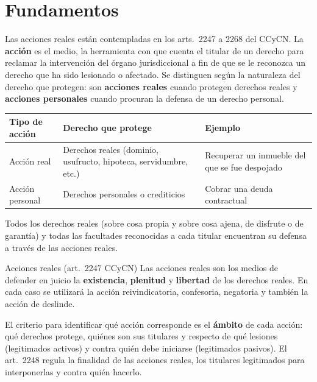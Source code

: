 \documentclass[12pt,oneside]{book}
\begin{document}
\section{Fundamentos}

Las acciones reales están contempladas en los arts.~2247 a 2268 del CCyCN. La \textbf{acción} es el medio, la herramienta con que cuenta el titular de un derecho para reclamar la intervención del órgano jurisdiccional a fin de que se le reconozca un derecho que ha sido lesionado o afectado. Se distinguen según la naturaleza del derecho que protegen: son \textbf{acciones reales} cuando protegen derechos reales y \textbf{acciones personales} cuando procuran la defensa de un derecho personal.

\begin{table}[H]
\centering
\begin{tabularx}{\textwidth}{@{}>{\raggedright\arraybackslash}p{}>{\raggedright\arraybackslash}X>{\raggedright\arraybackslash}X@{}}
\toprule
\textbf{Tipo de acción} & \textbf{Derecho que protege} & \textbf{Ejemplo} \\
\midrule
Acción real & Derechos reales (dominio, usufructo, hipoteca, servidumbre, etc.) & Recuperar un inmueble del que se fue despojado \\
Acción personal & Derechos personales o crediticios & Cobrar una deuda contractual \\
\bottomrule
\end{tabularx}
\end{table}

Todos los derechos reales (sobre cosa propia y sobre cosa ajena, de disfrute o de garantía) y todas las facultades reconocidas a cada titular encuentran su defensa a través de las acciones reales.

\begin{definition}{Acciones reales (art.~2247 CCyCN)}
Las acciones reales son los medios de defender en juicio la \textbf{existencia}, \textbf{plenitud} y \textbf{libertad} de los derechos reales. En cada caso se utilizará la acción reivindicatoria, confesoria, negatoria y también la acción de deslinde.
\end{definition}

El criterio para identificar qué acción corresponde es el \textbf{ámbito} de cada acción: qué derechos protege, quiénes son sus titulares y respecto de qué lesiones (legitimados activos) y contra quién debe iniciarse (legitimados pasivos). El art.~2248 regula la finalidad de las acciones reales, los titulares legitimados para interponerlas y contra quién hacerlo.
\end{document}
